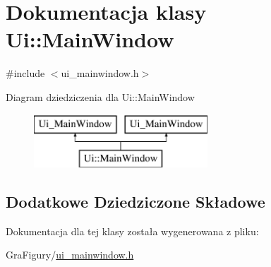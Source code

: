 \hypertarget{classUi_1_1MainWindow}{\section{Dokumentacja klasy Ui\-:\-:Main\-Window}
\label{classUi_1_1MainWindow}
}


{\ttfamily \#include $<$ui\-\_\-mainwindow.\-h$>$}

Diagram dziedziczenia dla Ui\-:\-:Main\-Window\begin{figure}[H]
\begin{center}
\leavevmode
\includegraphics[height=2.000000cm]{d9/dbd/classUi_1_1MainWindow}
\end{center}
\end{figure}
\subsection*{Dodatkowe Dziedziczone Składowe}


Dokumentacja dla tej klasy została wygenerowana z pliku\-:\begin{DoxyCompactItemize}
\item 
Gra\-Figury/\hyperlink{GraFigury_2ui__mainwindow_8h}{ui\-\_\-mainwindow.\-h}\end{DoxyCompactItemize}
